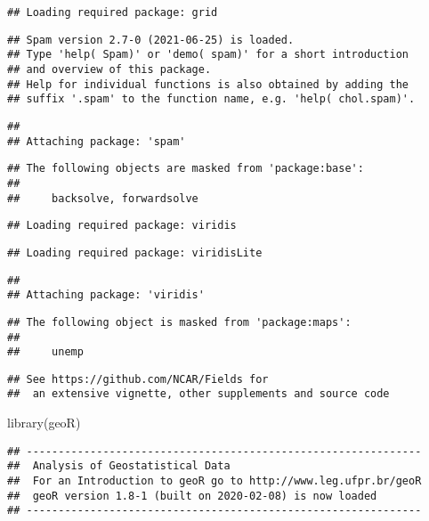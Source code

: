 \documentclass[
]{article}
\newenvironment{Shaded}{\begin{snugshade}}{\end{snugshade}}
\newcommand{\FunctionTok}[1]{\textcolor[rgb]{0.00,0.00,0.00}{#1}}
\newcommand{\NormalTok}[1]{#1}
\begin{document}
\begin{verbatim}
## Loading required package: grid
\end{verbatim}

\begin{verbatim}
## Spam version 2.7-0 (2021-06-25) is loaded.
## Type 'help( Spam)' or 'demo( spam)' for a short introduction 
## and overview of this package.
## Help for individual functions is also obtained by adding the
## suffix '.spam' to the function name, e.g. 'help( chol.spam)'.
\end{verbatim}

\begin{verbatim}
## 
## Attaching package: 'spam'
\end{verbatim}

\begin{verbatim}
## The following objects are masked from 'package:base':
## 
##     backsolve, forwardsolve
\end{verbatim}

\begin{verbatim}
## Loading required package: viridis
\end{verbatim}

\begin{verbatim}
## Loading required package: viridisLite
\end{verbatim}

\begin{verbatim}
## 
## Attaching package: 'viridis'
\end{verbatim}

\begin{verbatim}
## The following object is masked from 'package:maps':
## 
##     unemp
\end{verbatim}

\begin{verbatim}
## See https://github.com/NCAR/Fields for
##  an extensive vignette, other supplements and source code
\end{verbatim}

\begin{Shaded}
\begin{Highlighting}[]
\FunctionTok{library}\NormalTok{(geoR)}
\end{Highlighting}
\end{Shaded}

\begin{verbatim}
## --------------------------------------------------------------
##  Analysis of Geostatistical Data
##  For an Introduction to geoR go to http://www.leg.ufpr.br/geoR
##  geoR version 1.8-1 (built on 2020-02-08) is now loaded
## --------------------------------------------------------------
\end{verbatim}
\end{document}
